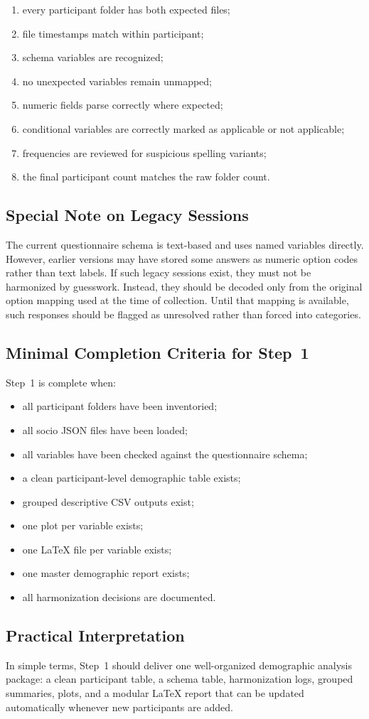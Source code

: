 \documentclass[11pt]{article}
\begin{document}
\begin{enumerate}
    \item every participant folder has both expected files;
    \item file timestamps match within participant;
    \item schema variables are recognized;
    \item no unexpected variables remain unmapped;
    \item numeric fields parse correctly where expected;
    \item conditional variables are correctly marked as applicable or not applicable;
    \item frequencies are reviewed for suspicious spelling variants;
    \item the final participant count matches the raw folder count.
\end{enumerate}

\subsection{Special Note on Legacy Sessions}
The current questionnaire schema is text-based and uses named variables directly.
However, earlier versions may have stored some answers as numeric option codes rather than text labels.
If such legacy sessions exist, they must not be harmonized by guesswork.
Instead, they should be decoded only from the original option mapping used at the time of collection.
Until that mapping is available, such responses should be flagged as unresolved rather than forced into categories.

\subsection{Minimal Completion Criteria for Step~1}
Step~1 is complete when:
\begin{itemize}
    \item all participant folders have been inventoried;
    \item all socio JSON files have been loaded;
    \item all variables have been checked against the questionnaire schema;
    \item a clean participant-level demographic table exists;
    \item grouped descriptive CSV outputs exist;
    \item one plot per variable exists;
    \item one \LaTeX{} file per variable exists;
    \item one master demographic report exists;
    \item all harmonization decisions are documented.
\end{itemize}

\subsection{Practical Interpretation}
In simple terms, Step~1 should deliver one well-organized demographic analysis package:
a clean participant table, a schema table, harmonization logs, grouped summaries, plots, and a modular
\LaTeX{} report that can be updated automatically whenever new participants are added.
\end{document}
